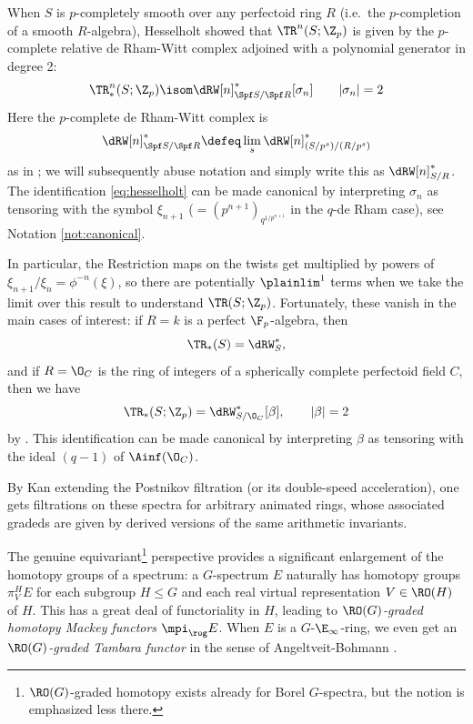 \begin{example}
  When $S$ is $p$-completely smooth over any perfectoid ring $R$ (i.e.\ the $p$-completion of a smooth $R$-algebra), Hesselholt \cite{LarsPTyp} showed that $\TR^n(S;\Z_p)$ is given by the $p$-complete relative de Rham-Witt complex \cite{LangerZinkDRW} adjoined with a polynomial generator in degree 2:
  \begin{equation}
    \label{eq:hesselholt}
    \TR^n_*(S;\Z_p) \isom \dRW[n]^*_{\Spf S/\Spf R}[\sigma_n]\qquad |\sigma_n|=2
  \end{equation}
  Here the $p$-complete de Rham-Witt complex is
  \[ \dRW[n]^*_{\Spf S/\Spf R} \defeq \lim_s \dRW[n]^*_{(S/p^s)/(R/p^s)} \]
  as in \cite[Definition 10.11]{BMS1}; we will subsequently abuse notation and simply write this as $\dRW[n]^*_{S/R}$.
  The identification \eqref{eq:hesselholt} can be made canonical by interpreting $\sigma_n$ as tensoring with the symbol $\xi_{n+1}$ ($= (p^{n+1})_{q^{1/p^{n+1}}}$ in the $q$-de Rham case), see Notation \ref{not:canonical}.

  In particular, the Restriction maps on the twists get multiplied by powers of $\xi_{n+1}/\xi_n=\phi^{-n}(\xi)$, so there are potentially $\plainlim^1$ terms when we take the limit over this result to understand $\TR(S;\Z_p)$. Fortunately, these vanish in the main cases of interest: if $R=k$ is a perfect $\F_p$-algebra, then
  \[ \TR_*(S) = \dRW^*_S, \]
  and if $R=\O_C$ is the ring of integers of a spherically complete perfectoid field $C$, then we have
  \[ \TR_*(S;\Z_p) = \dRW^*_{S/\O_C}[\beta], \qquad |\beta| = 2 \]
   by \cite[Lemma 7.22]{MathewK1}. This identification can be made canonical by interpreting $\beta$ as tensoring with the ideal $(q-1)$ of $\Ainf(\O_C)$.
\end{example}

By Kan extending the Postnikov filtration (or its double-speed acceleration), one gets filtrations on these spectra for arbitrary animated rings, whose associated gradeds are given by derived versions of the same arithmetic invariants.

The genuine equivariant\footnote{$\RO(G)$-graded homotopy exists already for Borel $G$-spectra, but the notion is emphasized less there.} perspective provides a significant enlargement of the homotopy groups of a spectrum: a $G$-spectrum $E$ naturally has homotopy groups $\pi_V^H E$ for each subgroup $H\le G$ and each real virtual representation $V\in\RO(H)$ of $H$. This has a great deal of functoriality in $H$, leading to \emph{$\RO(G)$-graded homotopy Mackey functors $\mpi_\rog E$}. When $E$ is a $G$-$\E_\infty$-ring, we even get an \emph{$\RO(G)$-graded Tambara functor} in the sense of Angeltveit-Bohmann \cite{GradedTambara}.

